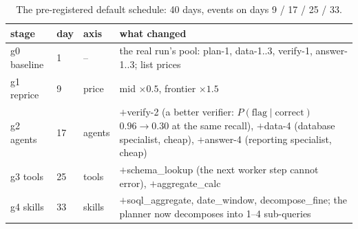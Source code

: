 \documentclass[10pt]{article}
\begin{document}
\begin{table}[htbp]
\centering\small
\caption{The pre-registered default schedule: 40 days, events on days 9 / 17 / 25 / 33.}
\label{tab:stages}
\begin{tabular}{llp{1.1cm}p{9.6cm}}
\toprule
stage & day & axis & what changed \\
\midrule
g0 baseline & 1 & -- & the real run's pool: plan-1, data-1..3, verify-1, answer-1..3; list prices \\
g1 reprice & 9 & price & mid $\times0.5$, frontier $\times1.5$ \\
g2 agents & 17 & agents & $+$verify-2 (a better verifier: $P(\text{flag}\mid\text{correct})$ $0.96\to0.30$ at the same recall), $+$data-4 (database specialist, cheap), $+$answer-4 (reporting specialist, cheap) \\
g3 tools & 25 & tools & $+$schema\_lookup (the next worker step cannot error), $+$aggregate\_calc \\
g4 skills & 33 & skills & $+$soql\_aggregate, date\_window, decompose\_fine; the planner now decomposes into 1--4 sub-queries \\
\bottomrule
\end{tabular}
\end{table}
\end{document}
